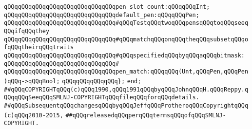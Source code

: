 \newline
\verb|qQQqqQQqqQQqqQQqqQQqqQQqqQQqqQQqpen_slot_count:qQQqqQQqInt;|\newline
\newline
\verb|qQQqqQQqqQQqqQQqqQQqqQQqqQQqqQQqdefault_pen:qQQqqQQqPen;|\newline
\newline
\verb|qQQqqQQqqQQqqQQqqQQqqQQqqQQqqQQq#qQQqTestqQQqtwoqQQqpensqQQqtoqQQqseeqQQqifqQQqthey|\newline
\verb|qQQqqQQqqQQqqQQqqQQqqQQqqQQqqQQq#qQQqmatchqQQqonqQQqtheqQQqsubsetqQQqofqQQqtheirqQQqtraits|\newline
\verb|qQQqqQQqqQQqqQQqqQQqqQQqqQQqqQQq#qQQqspecifiedqQQqbyqQQqaqQQqbitmask:|\newline
\verb|qQQqqQQqqQQqqQQqqQQqqQQqqQQqqQQq#|\newline
\verb|qQQqqQQqqQQqqQQqqQQqqQQqqQQqqQQqpen_match:qQQqqQQq(Unt,qQQqPen,qQQqPen)qQQq->qQQqBool;|\newline
\verb|qQQqqQQqqQQqqQQq};|\newline
\newline
\verb|end;|\newline
\newline
\newline
\verb|##qQQqCOPYRIGHTqQQq(c)qQQq1990,qQQq1991qQQqbyqQQqJohnqQQqH.qQQqReppy.qQQqqQQqSeeqQQqSMLNJ-COPYRIGHTqQQqfileqQQqforqQQqdetails.|\newline
\verb|##qQQqSubsequentqQQqchangesqQQqbyqQQqJeffqQQqProtheroqQQqCopyrightqQQq(c)qQQq2010-2015,|\newline
\verb|##qQQqreleasedqQQqperqQQqtermsqQQqofqQQqSMLNJ-COPYRIGHT.|\newline

